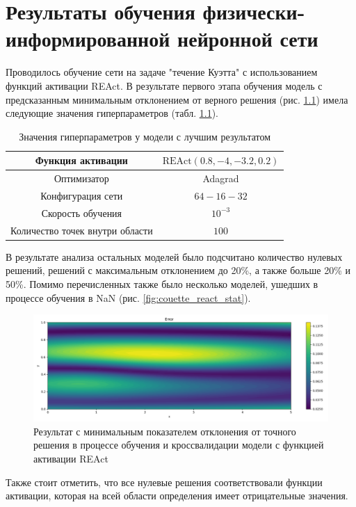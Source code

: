 \chapter{Результаты обучения физически-информированной нейронной сети}
Проводилось обучение сети на задаче "течение Куэтта" с использованием функций активации REAct.
В результате первого этапа обучения модель с предсказанным минимальным отклонением от
верного решения (рис. \ref{fig:couette_react_best}) имела следующие значения
гиперпараметров (табл. \ref{table:couette_react_best_params}).

\begin{table}[ht]
    \centering
    \caption{Значения гиперпараметров у модели с лучшим результатом}
    \begin{tabular}{ |c|c| } 
        \hline
        Функция активации & $\text{REAct}(0.8, -4, -3.2, 0.2)$ \\
        \hline
        Оптимизатор & Adagrad \\ 
        \hline
        Конфигурация сети & $64-16-32$ \\ 
        \hline
        Скорость обучения & $10^{-3}$ \\ 
        \hline
        Количество точек внутри области & $100$ \\ 
        \hline
    \end{tabular}
    \label{table:couette_react_best_params}
\end{table}

В результате анализа остальных моделей было подсчитано количество нулевых
решений, решений с максимальным отклонением до 20\%, а также больше 20\% и 50\%.
Помимо перечисленных также было несколько моделей, ушедших в процессе обучения в
NaN (рис. \ref{fig:couette_react_stat}).

\begin{figure}[ht]
    \includegraphics{data/couette_react_error_best.png}
    \caption{Результат с минимальным показателем отклонения от точного решения в процессе обучения и
    кроссвалидации модели с функцией активации REAct}
    \label{fig:couette_react_best}
\end{figure}
Также стоит отметить, что все нулевые решения соответствовали функции активации,
которая на всей области определения имеет отрицательные значения.

